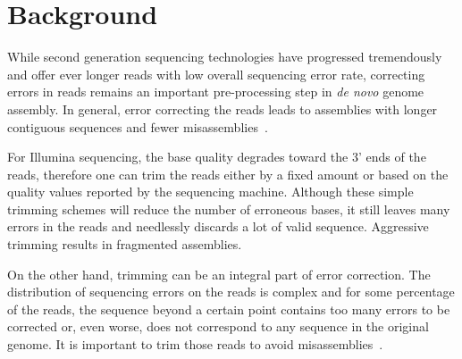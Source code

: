 \documentclass[10pt]{bmc_article}
\newenvironment{bmcformat}{\fussy\setboolean{publ}{true}}{\fussy}
\begin{document}
\begin{bmcformat}




\section*{Background}
While second generation sequencing technologies have progressed tremendously and offer ever longer reads with low overall sequencing error rate, correcting errors in reads remains an important pre-processing step in \emph{de novo} genome assembly.
In general, error correcting the reads leads to assemblies with longer contiguous sequences and fewer misassemblies~\cite{Salzberg2011}.

For Illumina sequencing, the base quality degrades toward the 3' ends of the reads, therefore one can trim the reads either by a fixed amount or based on the quality values reported by the sequencing machine.
Although these simple trimming schemes will reduce the number of erroneous bases, it still leaves many errors in the reads and needlessly discards a lot of valid sequence. 
Aggressive trimming results in fragmented assemblies.

On the other hand, trimming can be an integral part of error correction.
The distribution of sequencing errors on the reads is complex and for some percentage of the reads, the sequence beyond a certain point contains too many errors to be corrected or, even worse, does not correspond to any sequence in the original genome.
It is important to trim those reads to avoid misassemblies~\cite{Salzberg2011}.


\end{bmcformat}
\end{document}
